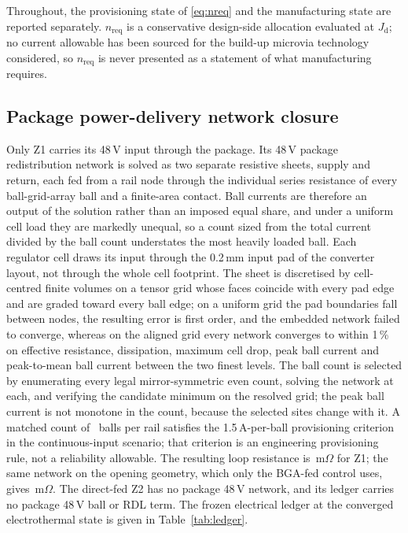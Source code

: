 \documentclass[journal]{IEEEtran}
\begin{document}
Throughout, the provisioning state of \eqref{eq:nreq} and the manufacturing state are
reported separately. $n_{\mathrm{req}}$ is a conservative design-side allocation evaluated at
$J_{\mathrm{d}}$; no current allowable has been sourced for the build-up microvia technology
considered, so $n_{\mathrm{req}}$ is never presented as a statement of what manufacturing
requires.
\subsection{Package power-delivery network closure}\label{sec:pdnclosure}
Only Z1 carries its 48\,V input through the package. Its 48\,V package redistribution network is
solved as two separate resistive sheets, supply and return, each fed from a rail node through
the individual series resistance of every ball-grid-array ball and a finite-area contact. Ball
currents are therefore an output of the solution rather than an imposed equal share, and under a
uniform cell load they are markedly unequal, so a count sized from the total current divided by
the ball count understates the most heavily loaded ball. Each regulator cell draws its input
through the 0.2\,mm input pad of the converter layout, not through the whole cell footprint. The
sheet is discretised by cell-centred finite volumes on a tensor grid whose faces coincide with
every pad edge and are graded toward every ball edge; on a uniform grid the pad boundaries fall
between nodes, the resulting error is first order, and the embedded network failed to converge,
whereas on the aligned grid every network converges to within 1\,\% on effective resistance,
dissipation, maximum cell drop, peak ball current and peak-to-mean ball current between the two
finest levels. The ball count is selected by enumerating every legal mirror-symmetric even count,
solving the network at each, and verifying the candidate minimum on the resolved grid; the peak
ball current is not monotone in the count, because the selected sites change with it. A matched
count of \NballMatched\ balls per rail satisfies the 1.5\,A-per-ball provisioning criterion in
the continuous-input scenario; that criterion is an engineering provisioning rule, not a
reliability allowable. The resulting loop resistance is \RloopZone\,m$\Omega$ for Z1; the same
network on the opening geometry, which only the BGA-fed control uses, gives
\RloopZtwo\,m$\Omega$. The direct-fed Z2 has no package 48\,V network, and its ledger carries no
package 48\,V ball or RDL term. The frozen electrical ledger at the converged electrothermal state
is given in Table~\ref{tab:ledger}.

\end{document}
